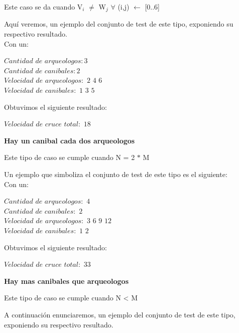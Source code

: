 Este caso se da cuando V$_{i}$ $\neq$ W$_{j}$ $\forall$ (i,j)  $\gets$ [0..6] 

Aqu\'i veremos, un ejemplo del conjunto de test de este tipo, exponiendo su respectivo resultado.\\

 Con un:
 \begin{flushleft} 
  	$Cantidad$ $de$ $arqueologos: 3 $  \\
	$Cantidad$ $de$ $canibales: 2 $  \\
	$Velocidad$ $de$ $arqueologos:$ $2$ $4$ $6 $  \\
	$Velocidad$ $de$ $canibales:$ $1$ $3$ $5 $  \\
\end{flushleft}
  Obtuvimos el siguiente resultado:
   \begin{flushleft}   
$Velocidad$ $de$ $cruce$ $total: $ $18$\\
\end{flushleft}

\begin{center}
 \textbf{Hay un canibal cada dos arqueologos}
\end{center}

Este tipo de caso se cumple cuando N = 2 $\ast$ M

Un ejemplo que simboliza el conjunto de test de este tipo es el siguiente:\\

 Con un:
 \begin{flushleft} 
  	$Cantidad$ $de$ $arqueologos:$ $4 $  \\
	$Cantidad$ $de$ $canibales:$ $2$ \\ 
	$Velocidad$ $de$ $arqueologos:$ $3$ $6$ $9$ $12$\\
	$Velocidad$ $de$ $canibales:$ $1$ $2$  \\
\end{flushleft}
  Obtuvimos el siguiente resultado:
   \begin{flushleft}   
$Velocidad$ $de$ $cruce$ $total: $ $33$\\
\end{flushleft}


\begin{center}
 \textbf{Hay mas canibales que arqueologos}
\end{center}

Este tipo de caso se cumple cuando N < M

A continuaci\'on enunciaremos, un ejemplo del conjunto de test de este tipo, exponiendo su respectivo resultado.\\

